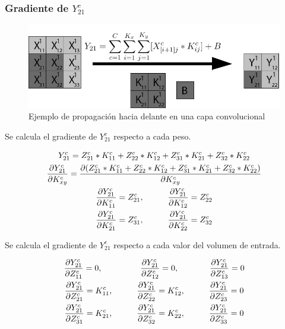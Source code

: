 \subsubsection{Gradiente de $Y^c_{21}$}

\begin{figure}[H]
	\centering
	\includegraphics[width=1\linewidth]{imagenes/conv_ejemplo_backprop_3.jpg} 
	\caption{Ejemplo de propagación hacia delante en una capa convolucional}
	\label{fig:ejemplo_3_forward_prop_convolucional}
\end{figure}

Se calcula el gradiente de $Y^c_{21}$ respecto a cada peso.

\begin{gather}
	Y^c_{21} = Z^c_{21} * K^c_{11} + Z^c_{22} * K^c_{12} + Z^c_{31} * K^c_{21} + Z^c_{32} * K^c_{22} \\
	\frac{\partial Y^c_{21}}{\partial K^c_{xy}} = \frac{\partial (Z^c_{21} * K^c_{11} + Z^c_{22} * K^c_{12} + Z^c_{31} * K^c_{21} + Z^c_{32} * K^c_{22})}{\partial K^c_{xy}} \\
	\frac{\partial Y^c_{21}}{\partial K^c_{11}} = Z^c_{21}, \hspace{10mm} \frac{\partial Y^c_{21}}{\partial K^c_{12}} = Z^c_{22}\\
	\frac{\partial Y^c_{21}}{\partial K^c_{21}} = Z^c_{31}, \hspace{10mm} \frac{\partial Y^c_{21}}{\partial K^c_{22}} = Z^c_{32}
\end{gather}

Se calcula el gradiente de $Y^c_{21}$ respecto a cada valor del volumen de entrada.

\begin{gather}
	\frac{\partial Y^c_{21}}{\partial Z^c_{11}} = 0, \hspace{16mm} \frac{\partial Y^c_{21}}{\partial Z^c_{12}} = 0, \hspace{13mm} \frac{\partial Y^c_{21}}{\partial Z^c_{13}} = 0\\
	\frac{\partial Y^c_{21}}{\partial Z^c_{21}} = K^c_{11}, \hspace{10mm} \frac{\partial Y^c_{21}}{\partial Z^c_{22}} = K^c_{12}, \hspace{10mm} \frac{\partial Y^c_{21}}{\partial Z^c_{23}} = 0\\
	\frac{\partial Y^c_{21}}{\partial Z^c_{31}} = K^c_{21}, \hspace{10mm} \frac{\partial Y^c_{21}}{\partial Z^c_{32}} = K^c_{22}, \hspace{10mm} \frac{\partial Y^c_{21}}{\partial Z^c_{33}} = 0 
\end{gather}

